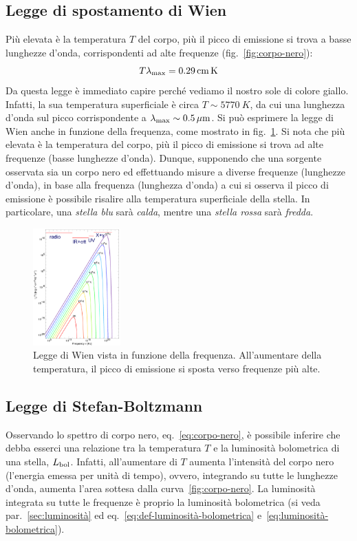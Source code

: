 \subsection{Legge di spostamento di Wien}\label{sec:legge-wien}
Più elevata è la temperatura $T$ del corpo, più il picco di emissione si trova a basse lunghezze d'onda, corrispondenti ad alte frequenze (fig.~\ref{fig:corpo-nero}):
\begin{equation}\label{eq:legge-wien}
    T \lambda_\textup{max} = \SI{0.29}{cm.K}
\end{equation}
Da questa legge è immediato capire perché vediamo il nostro sole di colore giallo. Infatti, la sua temperatura superficiale è circa $T \sim \SI{5770}{K}$, da cui una lunghezza d'onda sul picco corrispondente a $\lambda_\textup{max} \sim \SI{0.5}{\mu m}$. Si può esprimere la legge di Wien anche in funzione della frequenza, come mostrato in fig.~\ref{fig:legge-wien}. Si nota che più elevata è la temperatura del corpo, più il picco di emissione si trova ad alte frequenze (basse lunghezze d'onda). Dunque, supponendo che una sorgente osservata sia un corpo nero ed effettuando misure a diverse frequenze (lunghezze d'onda), in base alla frequenza (lunghezza d'onda) a cui si osserva il picco di emissione è possibile risalire alla temperatura superficiale della stella. In particolare, una \emph{stella blu} sarà \emph{calda}, mentre una \emph{stella rossa} sarà \emph{fredda}.

\begin{figure}
\centering
\includegraphics[width=0.3\textwidth]{immagini/legge-wien.png}
\caption{Legge di Wien vista in funzione della frequenza. All'aumentare della temperatura, il picco di emissione si sposta verso frequenze più alte.}
\label{fig:legge-wien}
\end{figure}

\subsection{Legge di Stefan-Boltzmann}\label{sec:legge-stefan-boltzmann}
Osservando lo spettro di corpo nero, eq.~\eqref{eq:corpo-nero}, è possibile inferire che debba esserci una relazione tra la temperatura $T$ e la luminosità bolometrica di una stella, $L_\textup{bol}$. Infatti, all'aumentare di $T$ aumenta l'intensità del corpo nero (l'energia emessa per unità di tempo), ovvero, integrando su tutte le lunghezze d'onda, aumenta l'area sottesa dalla curva~\ref{fig:corpo-nero}. La luminosità integrata su tutte le frequenze è proprio la luminosità bolometrica (si veda par.~\ref{sec:luminosità} ed eq.~\eqref{eq:def-luminosità-bolometrica} e~\eqref{eq:luminosità-bolometrica}).

